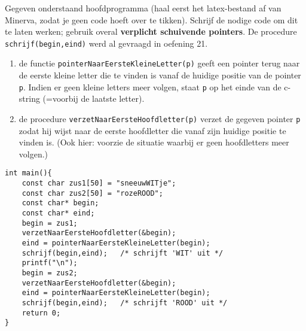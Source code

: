 \beginoef
%
Gegeven onderstaand hoofdprogramma  (haal eerst het latex-bestand af van Minerva, zodat je geen code hoeft over te tikken). Schrijf de nodige code om dit te laten werken; gebruik overal {\bf verplicht schuivende pointers}. De procedure \verb}schrijf(begin,eind)} werd al gevraagd in oefening 21.


\begin{enumerate}
\item de functie \verb}pointerNaarEersteKleineLetter(p)} geeft een pointer terug naar de eerste kleine letter die te vinden is vanaf de huidige positie van de pointer \verb}p}.
Indien er geen kleine letters meer volgen, staat \verb}p} op het einde van de c-string (=voorbij de laatste letter).

\item de procedure \verb}verzetNaarEersteHoofdletter(p)} verzet de gegeven pointer \verb}p} zodat hij wijst naar de eerste hoofdletter die vanaf zijn huidige positie te vinden is.
(Ook hier: voorzie de situatie waarbij er geen hoofdletters meer volgen.)

\end{enumerate}
\begin{footnotesize}
\begin{verbatim}
int main(){	
    const char zus1[50] = "sneeuwWITje";
    const char zus2[50] = "rozeROOD";                                        
    const char* begin;
    const char* eind;	   
    begin = zus1;
    verzetNaarEersteHoofdletter(&begin);	
    eind = pointerNaarEersteKleineLetter(begin);		
    schrijf(begin,eind);   /* schrijft 'WIT' uit */
    printf("\n");	    
    begin = zus2;
    verzetNaarEersteHoofdletter(&begin);
    eind = pointerNaarEersteKleineLetter(begin);	
    schrijf(begin,eind);   /* schrijft 'ROOD' uit */	
    return 0;
}
\end{verbatim}
\end{footnotesize}
\endoef

